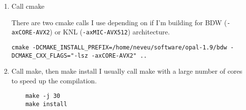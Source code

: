 \documentclass[table]{iitthesis}
\begin{document}
\begin{enumerate}[label=Step \arabic*:]
    \item Call cmake 
    
There are two cmake calls I use depending on if I'm building for 
BDW (\verb|-axCORE-AVX2|) or KNL (\verb|-axMIC-AVX512|) architecture. 
    
\begin{lstlisting}
cmake -DCMAKE_INSTALL_PREFIX=/home/neveu/software/opal-1.9/bdw -DCMAKE_CXX_FLAGS="-lsz -axCORE-AVX2" ..
\end{lstlisting}

    \item Call make, then make install
I usually call make with a large number of cores to speed up the compilation.    
\begin{lstlisting}
	make -j 30 
	make install
\end{lstlisting}

\end{enumerate}




\label{3dmaps}
\end{document}
